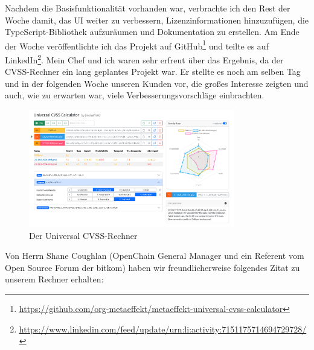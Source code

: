 Nachdem die Basisfunktionalität vorhanden war, verbrachte ich den Rest der Woche damit, das UI weiter zu verbessern, Lizenzinformationen hinzuzufügen, die TypeScript-Bibliothek aufzuräumen und Dokumentation zu erstellen.
Am Ende der Woche veröffentlichte ich das Projekt auf GitHub\footnote{\url{https://github.com/org-metaeffekt/metaeffekt-universal-cvss-calculator}} und teilte es auf LinkedIn\footnote{\url{https://www.linkedin.com/feed/update/urn:li:activity:7151175714694729728/}}.
Mein Chef und ich waren sehr erfreut über das Ergebnis, da der CVSS-Rechner ein lang geplantes Projekt war.
Er stellte es noch am selben Tag und in der folgenden Woche unseren Kunden vor, die großes Interesse zeigten und auch, wie zu erwarten war, viele Verbesserungsvorschläge einbrachten.

\begin{figure}[htbp] %
    \centering
    \includegraphics[width=0.8\textwidth, keepaspectratio]{res/img/metaeffekt-cvss-calculator-ui}
    \caption{Der {\metaeffekt} Universal CVSS-Rechner}
    \label{fig:metaeffekt-cvss-calculator-ui-initial}
\end{figure}

Von Herrn Shane Coughlan (OpenChain General Manager und ein Referent vom Open Source Forum der bitkom) haben wir freundlicherweise folgendes Zitat zu unserem Rechner erhalten:
\begin{quote}
    \textit{}
\end{quote}
